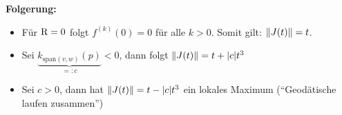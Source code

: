 \textbf{Folgerung:}\\
\begin{itemize}
    \item Für $\operatorname{R} = 0$ folgt $f^{(k)}(0)=0$ für alle $k>0$.
        Somit gilt: $\norm{J(t)}=t$.
    \item Sei $\underbrace{k_{\text{span}(v,w)} (p)}_{=:c} < 0$, dann folgt
        $\norm{J(t)} = t + \abs{c}t^3$
    \item Sei $c>0$, dann hat $\norm{J(t)}=t-\abs{c}t^3$ ein lokales Maximum (``Geodätische laufen zusammen'')
\end{itemize}















